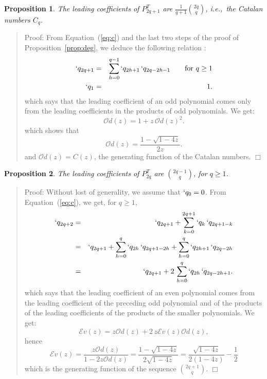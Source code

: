 \documentclass[preprint,authoryear]{elsarticle}
\newenvironment{proof}[1]{\begin{quotation}\noindent\textsf{Proof:} #1}{\(\Box\)\end{quotation}}
\newtheorem{prop}{Proposition}
\newcommand{\ie}{i.e.,~}
\newcommand{\Od}{\mathcal{O}d}
\newcommand{\Ev}{\mathcal{E}v}
\begin{document}
\begin{prop}\label{prop:lead_co_P_odd}
  The leading coefficients of $P^T_{2q+1}$ are $\frac{1}{q+1}{2q \choose q}$, \ie the
  Catalan numbers $C_q$.
\end{prop}
\begin{proof}{}
  From Equation~(\ref{eq:c}) and the last two steps of the proof of
  Proposition~\ref{prop:deg}, we deduce the following relation :
\begin{eqnarray*}
     `q_{2q+1} &=& \sum_{h=0}^{q-1} `q_{2h+1}\, `q_{2q- 2h-1} \qquad \textrm{for~} q\ge 1\\
     `q_1 &=&1.
\end{eqnarray*}
which says that the leading coefficient of an odd  polynomial comes only from the leading
coefficients in the products of odd polynomials.
We get:
\begin{displaymath}
  \Od(z) = 1 + z\,\Od(z)^2.
\end{displaymath}
which shows that
\begin{displaymath}
\Od(z) = \frac{1-\sqrt{1-4z}}{2z}.
\end{displaymath}
and $\Od(z) = C(z)$, the generating function of the Catalan numbers.
\end{proof}
\begin{prop}
  The leading coefficients of $P^T_{2q}$ are ${ 2q-1 \choose q}$, for $q\ge 1$.
\end{prop}
\begin{proof}{}
Without lost of generality, we  assume that $`q_0=0$.
From Equation~(\ref{eq:c}), we get, for $q\ge 1$,
  \begin{eqnarray*}
    `q_{2q+2} &=& `q_{2q+1} + \sum_{k=0}^{2q+1} `q_{k}\, `q_{2q+1-k} \\
    &=& `q_{2q+1} + \sum_{h=0}^{q}`q_{2h} \,`q_{2q+1-2h} + \sum_{h=0}^{q} `q_{2h+1}\, `q_{2q - 2h} \\
    &=& `q_{2q+1} + 2\,\sum_{h=0}^{q} `q_{2h}\, `q_{2q - 2h+1}.
   \end{eqnarray*}
which says that the leading coefficient of an even polynomial comes from the leading
coefficient of the preceding odd polynomial and of the products of the leading coefficients of
the products of the smaller polynomials. 
We get:
\begin{displaymath}
  \Ev(z) = z\Od(z) + 2\,z \Ev(z)\Od(z),
\end{displaymath}
hence
\begin{displaymath}
  \Ev(z) = \frac{z \Od(z)}{1-2z \Od(z)} = \frac{1-\sqrt{1-4z}}{2\sqrt{1-4z}} =
  \frac{\sqrt{1-4z}}{2(1-4z)} - \frac{1}{2}
\end{displaymath}
which is the generating function of  the sequence ${ 2q+1 \choose q}$.
\end{proof}
\end{document}
